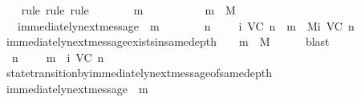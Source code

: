 \begin{isabellebody}
\isadelimproof
\ \ %
\endisadelimproof
%
\isatagproof
{}\isamarkupfalse%
\ {\isacharparenleft}rule{\isacharcomma}\ rule{\isacharcomma}\ rule{\isacharparenright}\isanewline
{}\isamarkupfalse%
\ {\isacharminus}\ \isanewline
\ \ \isamarkupfalse%
\ {\isasymsigma}\ m\isanewline
\ \ \isamarkupfalse%
\ {\isachardoublequoteopen}{\isasymsigma}\ {\isasymin}\ {\isasymSigma}{\isachardoublequoteclose}\ \isanewline
\ \ \ {\isachardoublequoteopen}m\ {\isasymin}\ M{\isachardoublequoteclose}\ \isanewline
\ \ \ {\isachardoublequoteopen}immediately{\isacharunderscore}next{\isacharunderscore}message\ {\isacharparenleft}{\isasymsigma}{\isacharcomma}\ m{\isacharparenright}{\isachardoublequoteclose}\ \isanewline
\ \ \isamarkupfalse%
\ \isamarkupfalse%
\ {\isachardoublequoteopen}{\isacharparenleft}{\isasymexists}\ n\ {\isasymin}\ {\isasymnat}{\isachardot}\ {\isasymsigma}\ {\isasymin}\ {\isasymSigma}i\ {\isacharparenleft}V{\isacharcomma}C{\isacharcomma}{\isasymepsilon}{\isacharparenright}\ n\ {\isasymand}\ m\ {\isasymin}\ Mi\ {\isacharparenleft}V{\isacharcomma}C{\isacharcomma}{\isasymepsilon}{\isacharparenright}\ n{\isacharparenright}{\isachardoublequoteclose}\isanewline
\ \ \ \ \isamarkupfalse%
\ immediately{\isacharunderscore}next{\isacharunderscore}message{\isacharunderscore}exists{\isacharunderscore}in{\isacharunderscore}same{\isacharunderscore}depth\ {\isacartoucheopen}{\isasymsigma}\ {\isasymin}\ {\isasymSigma}{\isacartoucheclose}\ {\isacartoucheopen}m\ {\isasymin}\ M{\isacartoucheclose}\isanewline
\ \ \ \ \isamarkupfalse%
\ blast\isanewline
\ \ \isamarkupfalse%
\ \isamarkupfalse%
\ {\isachardoublequoteopen}{\isasymexists}\ n\ {\isasymin}\ {\isasymnat}{\isachardot}\ {\isasymsigma}\ {\isasymunion}\ {\isacharbraceleft}m{\isacharbraceright}\ {\isasymin}\ {\isasymSigma}i\ {\isacharparenleft}V{\isacharcomma}C{\isacharcomma}{\isasymepsilon}{\isacharparenright}\ {\isacharparenleft}n\ {\isacharplus}\ {}{\isacharparenright}{\isachardoublequoteclose}\isanewline
\ \ \ \ \isamarkupfalse%
\ state{\isacharunderscore}transition{\isacharunderscore}by{\isacharunderscore}immediately{\isacharunderscore}next{\isacharunderscore}message{\isacharunderscore}of{\isacharunderscore}same{\isacharunderscore}depth\isanewline
\ \ \ \ \isamarkupfalse%
\ {\isacartoucheopen}immediately{\isacharunderscore}next{\isacharunderscore}message\ {\isacharparenleft}{\isasymsigma}{\isacharcomma}\ m{\isacharparenright}{\isacartoucheclose}\ \isamarkupfalse%

\end{isabellebody}
